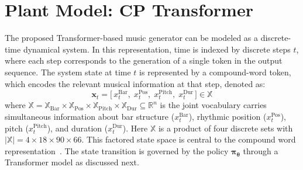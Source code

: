 \documentclass[letterpaper, 10 pt, conference]{ieeeconf}
\begin{document}

\section{Plant Model: CP Transformer}

The proposed Transformer-based music generator can be modeled as a discrete-time dynamical system. In this representation, time is indexed by discrete steps $t$, where each step corresponds to the generation of a single token in the output sequence. The system state at time $t$ is represented by a compound-word token, which encodes the relevant musical information at that step, denoted as:
\begin{equation}
    \textbf{x}_t = \bigl[\,x_{t}^{\mathrm{Bar}},\; x_{t}^{\mathrm{Pos}},\; x_{t}^{\mathrm{Pitch}},\; x_{t}^{\mathrm{Dur}}\,\bigr] \in \mathbb{X}
\end{equation}
where $\mathbb{X} = \mathbb{X}_{\mathrm{Bar}} \times \mathbb{X}_{\mathrm{Pos}} \times \mathbb{X}_{\mathrm{Pitch}} \times \mathbb{X}_{\mathrm{Dur}} \subseteq \mathbb{R}^{n}$ is the joint vocabulary carries simultaneous information about bar structure ($x_{t}^{\mathrm{Bar}}$), rhythmic position ($x_{t}^{\mathrm{Pos}}$), pitch ($x_{t}^{\mathrm{Pitch}}$), and duration ($x_{t}^{\mathrm{Dur}}$). Here $\mathbb{X}$ is a product of four discrete sets with  $|\mathbb{X}| = 4 \times 18 \times 90 \times 66$. This factored state space is central to the compound word representation~\cite{cp_representation}. The state transition is governed by the policy $\bm{\pi}_{\bm{\theta}}$ through a Transformer model as discussed next.  %
\end{document}
